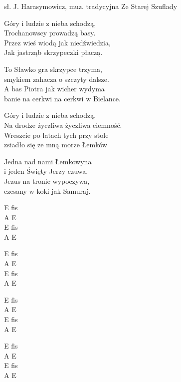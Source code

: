 {sł. J. Harasymowicz, muz. tradycyjna}
{Ze Starej Szuflady}
\begin{text}
Góry i ludzie z nieba schodzą,\\
Trochanowscy prowadzą basy.\\
Przez wieś wiodą jak niedźwiedzia,\\
Jak jastrząb skrzypeczki płaczą.

To Sławko gra skrzypce trzyma,\\
smykiem zahacza o szczyty dalsze.\\
A bas Piotra jak wicher wydyma\\
banie na cerkwi na cerkwi w Bielance.

Góry i ludzie z nieba schodzą,\\
Na drodze życzliwa życzliwa ciemność.\\
Wreszcie po latach tych przy stole\\
zsiadło się ze mną morze Łemków

Jedna nad nami Łemkowyna\\
i jeden Święty Jerzy czuwa.\\
Jezus na tronie wypoczywa,\\
czesany w koki jak Samuraj.
\end{text}
\begin{chord}
E fis\\
A E\\
E fis\\
A E

E fis\\
A E\\
E fis\\
A E

E fis\\
A E\\
E fis\\
A E

E fis\\
A E\\
E fis\\
A E
\end{chord}



